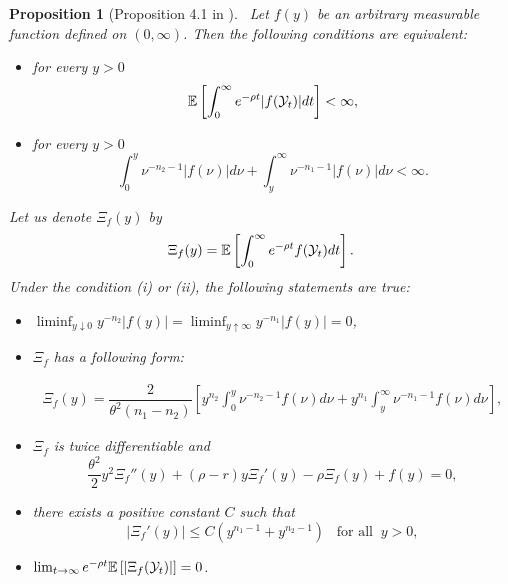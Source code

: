 \documentclass[a4paper,report, 11pt]{article}
\newtheorem{pro}{Proposition}[section]
\def\t{\theta}
\begin{document}
\begin{pro}[Proposition 4.1 in \citet{KMZ}]~\label{pro:review:KMZ}
	Let $f(y)$ be an arbitrary measurable function defined on $(0,\infty)$. Then the following conditions are equivalent:
	\begin{itemize}
		\item[(i)] for every $y>0$ 
		$$
		\mathbb{E}\left[\int_0^\infty e^{-\rho t}|f({\cal Y}_t)|dt \right]<\infty,
		$$
		\item[(ii)] for every $y>0$ 
		$$
		\int_0^y \nu^{-n_2-1} |f(\nu)|d\nu +\int_y^\infty \nu^{-n_1-1}|f(\nu)|d\nu <\infty. 
		$$
	\end{itemize}
	Let us denote $\Xi_f(y)$ by 
	$$
	\Xi_f(y) = \mathbb{E}\left[\int_0^\infty e^{-\rho t} f({\cal Y}_t)dt\right]. 
	$$
	Under the condition (i) or (ii), the following statements are true:
	\begin{itemize}
		\item[(a)] $\liminf_{y\downarrow 0}y^{-n_2}|f(y)|=\liminf_{y\uparrow \infty}y^{-n_1}|f(y)|=0$,
		\item[(b)] $\Xi_f$ has a following form: 
		\begin{footnotesize}
			\begin{align*}
			\Xi_f (y) = \dfrac{2}{\t^2(n_1-n_2)}\left[y^{n_2}\int_0^y \nu^{-n_2-1}f(\nu)d\nu +y^{n_1}\int_y^\infty \nu^{-n_1-1}f(\nu)d\nu\right],
			\end{align*}
		\end{footnotesize}
		\item[(c)] $\Xi_f$ is twice differentiable and 
		$$
		\dfrac{\t^2}{2}y^2\Xi_f''(y) + (\rho-r)y\Xi_f'(y) -\rho \Xi_f(y) +f(y)=0,
		$$
		\item[(d)] there exists a positive constant $C$ such that 
		$$
		|\Xi_f'(y)|\le C(y^{n_1-1}+y^{n_2-1})\;\;\;\mbox{for all}\;\;y>0,
		$$
		\item[(e)] $\lim_{t\to \infty} e^{-\rho t} \mathbb{E}\left[|\Xi_f({\cal Y}_t)|\right]=0$. 
	\end{itemize}
\end{pro}
\end{document}
